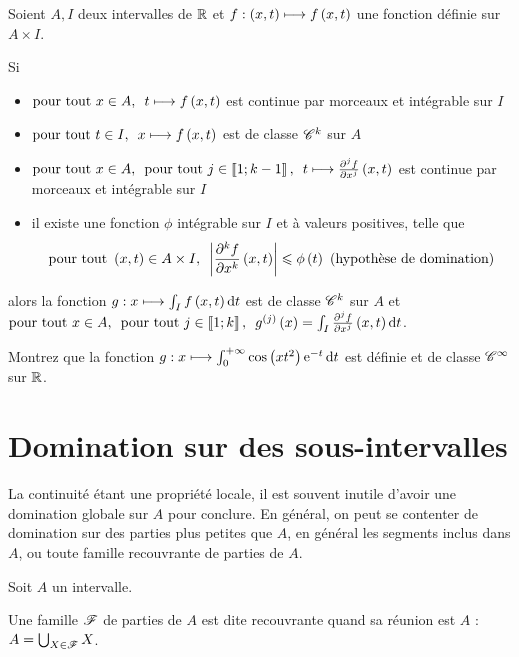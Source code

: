 \begin{theo}
Soient \(A,I\) deux intervalles de \(\mathbb{R}\) et \(f:\left(x,t\right)\longmapsto f\left(x,t\right)\) une fonction définie sur \(A\times I\).

Si

\begin{itemize}
    \item \(\quantifs{\tpt x\in A}t\mapsto f\paren{x,t}\) est continue par morceaux et intégrable sur \(I\) \\
    \item \(\quantifs{\tpt t\in I}x\mapsto f\paren{x,t}\) est de classe \(\mathscr{C}^{k}\) sur \(A\) \\
    \item \(\quantifs{\tpt x\in A;\tpt j\in\interventierii{1}{k-1}}t\mapsto\pdv[order=j]{f}{x}\paren{x,t}\) est continue par morceaux et intégrable sur \(I\) \\
    \item il existe une fonction \(\phi\) intégrable sur \(I\) et à valeurs positives, telle que \[\quantifs{\tpt\paren{x,t}\in A\times I}\abs{\pdv[order=k]{f}{x}\paren{x,t}}\leq\phi\paren{t}\text{ (hypothèse de domination)}\]
\end{itemize}

alors la fonction \(g:x\mapsto\int_If\paren{x,t}\odif{t}\) est de classe \(\mathscr{C}^{k}\) sur \(A\) et \(\quantifs{\tpt x\in A;\tpt j\in\interventierii{1}{k}}g\deriv{j}\paren{x}=\int_I\pdv[order=j]{f}{x}\paren{x,t}\odif{t}\).
\end{theo}

\begin{exo}
Montrez que la fonction \(g:x\mapsto\int_0^{\pinf}\cos\paren{xt^2}\e{-t}\odif{t}\) est définie et de classe \(\mathscr{C}^{\infty}\) sur \(\mathbb{R}\).
\end{exo}

\section{Domination sur des sous-intervalles}

La continuité étant une propriété locale, il est souvent inutile d'avoir une domination globale sur \(A\) pour conclure. En général, on peut se contenter de domination sur des parties plus petites que \(A\), en général les segments inclus dans \(A\), ou toute famille recouvrante de parties de \(A\).

\begin{defi}
Soit \(A\) un intervalle.

Une famille \(\mathscr{F}\) de parties de \(A\) est dite recouvrante quand sa réunion est \(A\) : \(A=\bigcup_{X\in\mathscr{F}}X\).
\end{defi}

